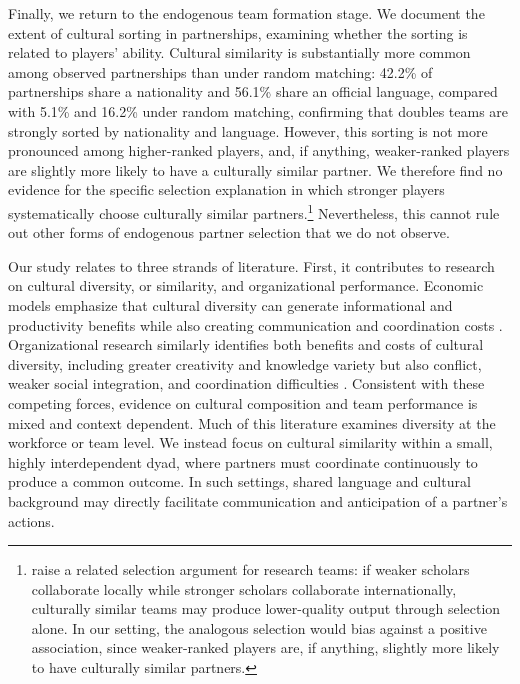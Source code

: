 \documentclass[10pt]{article}
\begin{document}
Finally, we return to the endogenous team formation stage. We document the extent of cultural sorting in partnerships, examining whether the sorting is related to  players' ability. Cultural similarity is substantially more common among observed partnerships than under random matching: 42.2\% of partnerships share a nationality and 56.1\% share an official language, compared with 5.1\% and 16.2\% under random matching, confirming that doubles teams are strongly sorted by nationality and language. However, this sorting is not more pronounced among higher-ranked players, and, if anything, weaker-ranked players are slightly more likely to have a culturally similar partner. We therefore find no evidence for the specific selection explanation in which stronger players systematically choose culturally similar partners.\footnote{\citet{freemanhuang2015} raise a related selection argument for research teams: if weaker scholars collaborate locally while stronger scholars collaborate internationally, culturally similar teams may produce lower-quality output through selection alone. In our setting, the analogous selection would bias against a positive association, since weaker-ranked players are, if anything, slightly more likely to have culturally similar partners.} Nevertheless, this  cannot rule out other forms of endogenous partner selection that we do not observe.

Our study relates to three strands of literature. First, it contributes to research on cultural diversity, or similarity, and organizational performance. Economic models emphasize that cultural diversity can generate informational and productivity benefits while also creating communication and coordination costs \citep{lazear1999}. Organizational research similarly identifies both benefits and costs of cultural diversity, including greater creativity and knowledge variety but also conflict, weaker social integration, and coordination difficulties \citep{stahl2010,harrisonklein2007}. Consistent with these competing forces, evidence on cultural composition and team performance is mixed and context dependent. Much of this literature examines diversity at the workforce or team level. We instead focus on cultural similarity within a small, highly interdependent dyad, where partners must coordinate continuously to produce a common outcome. In such settings, shared language and cultural background may directly facilitate communication and anticipation of a partner’s actions.
\end{document}
